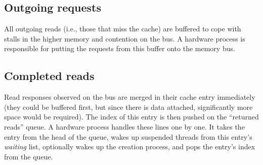 \subsection{Outgoing requests}
All outgoing reads (i.e., those that miss the cache) are buffered to cope with stalls in the higher memory and contention on the bus. A hardware process is responsible for putting the requests from this buffer onto the memory bus.

\subsection{Completed reads}
Read responses observed on the bus are merged in their cache entry immediately (they could be buffered first, but since there is data attached, significantly more space would be required). The index of this entry is then pushed on the ``returned reads'' queue. A hardware process handles these lines one by one. It takes the entry from the head of the queue, wakes up suspended threads from this entry's \emph{waiting} list, optionally wakes up the creation process, and pops the entry's index from the queue.